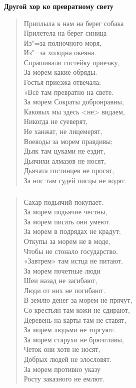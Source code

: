 \documentclass{beamer}
\begin{document}
%

\begin{frame}
\frametitle{}

\begin{center}
\textbf{Другой хор ко превратному свету}
\end{center}

\begin{verse}
Приплыла к нам на берег собака\\
Прилетела на берег синица\\
Из"=за полночного моря,\\
Из"=за холодна океяна.\\
Спрашивали гостейку приезжу,\\
За морем какие обряды.\\
Гостья приезжа отвечала:\\
«Всё там превратно на свете.\\
За морем Сократы добронравны,\\
Каковых мы здесь <не> видаем,\\
Никогда не суеверят,\\
Не ханжат, не лицемерят,\\
Воеводы за морем правдивы;\\
Дьяк там цуками не ездит,\\
Дьячихи алмазов не носят,\\
Дьячата гостинцев не просят,\\
За нос там судей писцы не водят.
\end{verse}
\end{frame}


\begin{frame}
\frametitle{}

\begin{verse}
Сахар подьячий покупает.\\
За морем подьячие честны,\\
За морем писать они умеют.\\
За морем в подрядах не крадут;\\
Откупы за морем не в моде,\\
Чтобы не стонало государство.\\
«Завтрем» там истца не питают.\\
За морем почетные люди\\
Шеи назад не загибают,\\
Люди от них не погибают.\\
В землю денег за морем не прячут,\\
Со крестьян там кожи не сдирают,\\
Деревень на карты там не ставят,\\
За морем людьми не торгуют.\\
За морем старухи не брюзгливы,\\
Четок они хотя не носят,\\
Добрых людей не злословят.\\
За морем противно указу\\
Росту заказного не емлют.
\end{verse}
\end{frame}
\end{document}
